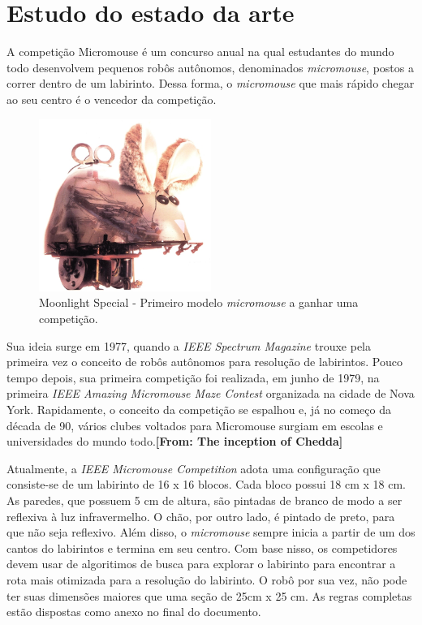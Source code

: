 \section{Estudo do estado da arte}
\label{sec:sota}
 \hspace{0.5cm} A competição Micromouse é um concurso anual na qual estudantes do mundo todo desenvolvem pequenos robôs autônomos, denominados \textit{micromouse}, postos a correr dentro de um labirinto. Dessa forma, o \textit{micromouse} que mais rápido chegar ao seu centro é o vencedor da competição.

 \begin{figure}[H]
 	\centering
 	\includegraphics[width=0.5\textwidth]
 	{Figures/MoonlightSpecial.jpg}
 	\caption{\label{fig:MoonlightSpecial} Moonlight Special - Primeiro modelo \textit{micromouse} a ganhar uma competição.}
 \end{figure}

 \hspace{0.5cm} Sua ideia surge em 1977, quando a \textit{IEEE Spectrum Magazine} trouxe pela primeira vez o conceito de robôs autônomos para resolução de labirintos. Pouco tempo depois, sua primeira competição foi realizada, em junho de 1979, na primeira \textit{IEEE Amazing Micromouse Maze Contest} organizada na cidade de Nova York. Rapidamente, o conceito da competição se espalhou e, já no começo da década de 90, vários clubes voltados para Micromouse surgiam em escolas e universidades do mundo todo.\textbf{[From: The inception of Chedda] }
 
 \hspace{0.5cm} Atualmente, a \textit{IEEE Micromouse Competition} adota uma configuração que consiste-se de um labirinto de 16 x 16 blocos. Cada bloco possui 18 cm x 18 cm. As paredes, que possuem 5 cm de altura, são pintadas de branco de modo a ser reflexiva à luz infravermelho. O chão, por outro lado, é pintado de preto, para que não seja reflexivo. Além disso, o \textit{micromouse} sempre inicia a partir de um dos cantos do labirintos e termina em seu centro. Com base nisso, os competidores devem usar de algoritimos de busca para explorar o labirinto para encontrar a rota mais otimizada para a resolução do labirinto. O robô por sua vez, não pode ter suas dimensões maiores que uma seção de 25cm x 25 cm. As regras completas estão dispostas como anexo no final do documento.


